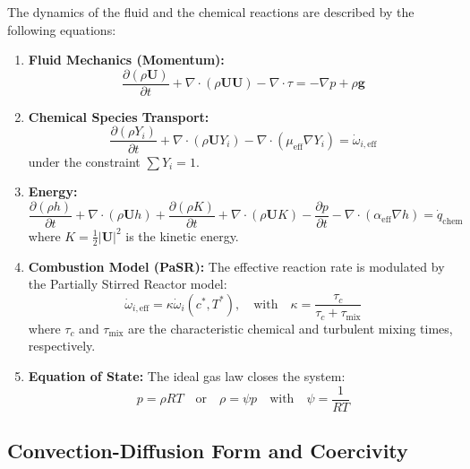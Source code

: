 \documentclass[11pt, a4paper]{article}
\begin{document}
The dynamics of the fluid and the chemical reactions are described by the following equations:
\begin{enumerate}
    \item \textbf{Fluid Mechanics (Momentum):}
    \begin{equation}
        \frac{\partial(\rho \mathbf{U})}{\partial t} + \nabla \cdot (\rho \mathbf{U} \mathbf{U}) - \nabla \cdot \tau = -\nabla p + \rho \mathbf{g}
    \end{equation}
    \item \textbf{Chemical Species Transport:}
    \begin{equation}
        \label{eq:species_transport}
        \frac{\partial(\rho Y_i)}{\partial t} + \nabla \cdot (\rho \mathbf{U} Y_i) - \nabla \cdot (\mu_{\mathrm{eff}} \nabla Y_i) = \dot{\omega}_{i, \mathrm{eff}}
    \end{equation}
    under the constraint $\sum Y_i = 1$.
    \item \textbf{Energy:}
    \begin{equation}
        \frac{\partial(\rho h)}{\partial t} + \nabla \cdot (\rho \mathbf{U} h) + \frac{\partial(\rho K)}{\partial t} + \nabla \cdot (\rho \mathbf{U} K) - \frac{\partial p}{\partial t} - \nabla \cdot (\alpha_{\mathrm{eff}} \nabla h) = \dot{q}_{\mathrm{chem}}
    \end{equation}
    where $K = \frac{1}{2}|\mathbf{U}|^2$ is the kinetic energy.
    \item \textbf{Combustion Model (PaSR):} The effective reaction rate is modulated by the Partially Stirred Reactor model:
    \begin{equation}
        \dot{\omega}_{i, \mathrm{eff}} = \kappa \dot{\omega}_i(c^*, T^*), \quad \text{with} \quad \kappa = \frac{\tau_c}{\tau_c + \tau_{\mathrm{mix}}}
    \end{equation}
    where $\tau_c$ and $\tau_{\mathrm{mix}}$ are the characteristic chemical and turbulent mixing times, respectively.
    \item \textbf{Equation of State:} The ideal gas law closes the system:
    \begin{equation}
        p = \rho R T \quad \text{or} \quad \rho = \psi p \quad \text{with} \quad \psi = \frac{1}{RT}
    \end{equation}
\end{enumerate}

\subsection{Convection-Diffusion Form and Coercivity}
\end{document}
